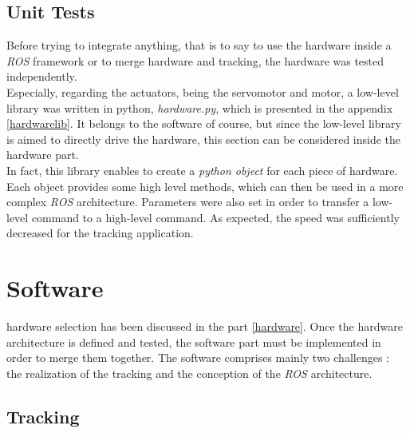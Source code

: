 	\section{Unit Tests}

		Before trying to integrate anything, that is to say 
		to use the hardware inside a \textit{ROS} framework 
		or to merge hardware and tracking, the hardware was
		tested independently.
		\\\indent Especially, regarding the actuators, 
		being the servomotor and motor, a low-level library 
		was written in python, \textit{hardware.py}, which is
		presented in the appendix \vref{hardwarelib}. 
		It belongs to the software of course, but since the low-level 
		library is aimed to directly drive the hardware, this 
		section can be considered inside the hardware part. 
		\\\indent In fact, this library enables to create
		a \textit{python object} for each piece
		of hardware. Each object provides
		some high level methods, which can 
		then be used in a more complex \textit{ROS}
		architecture. Parameters were also set 
		in order to transfer a low-level command
		to a high-level command. As expected, 
		the speed was sufficiently decreased for
		the tracking application.
		

\chapter{Software}\label{software}

	 hardware selection has been discussed in the part \vref{hardware}. 
	Once the hardware architecture is defined and tested, the software 
	part must be implemented in order to merge them together. The software
	comprises mainly two challenges : the realization of the tracking and the
	conception of the \textit{ROS} architecture.
	
	\section{Tracking}\label{tracking}
	
		
